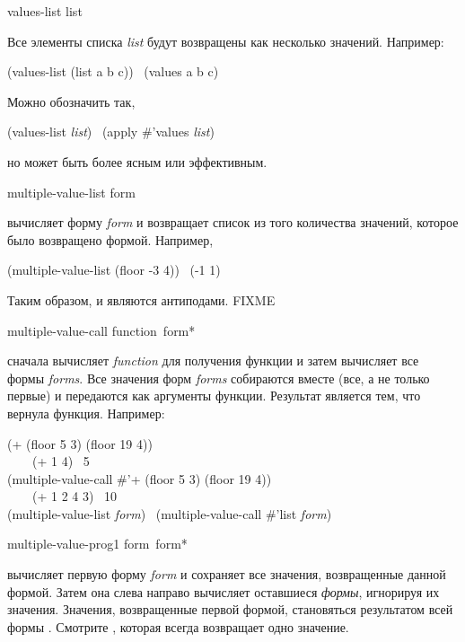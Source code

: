 \begin{defun}[Function]
values-list list

Все элементы списка \emph{list} будут возвращены как несколько значений.
Например:
\begin{lisp}
(values-list (list a b c)) \EQ\ (values a b c)
\end{lisp}
Можно обозначить так,
\begin{lisp}
(values-list \emph{list}) \EQ\ (apply \#'values \emph{list})
\end{lisp}
но  может быть более ясным или эффективным.
\end{defun}

\begin{defmac}
multiple-value-list form

 вычисляет форму \emph{form} и возвращает список из
того количества значений, которое было возвращено формой.
Например,
\begin{lisp}
(multiple-value-list (floor -3 4)) \EV\ (-1 1)
\end{lisp}
Таким образом,  и  являются
антиподами. FIXME
\end{defmac}

\begin{defspec}
multiple-value-call function {\,form}*

 сначала вычисляет \emph{function} для получения
функции и затем вычисляет все формы \emph{forms}. Все значения форм \emph{forms}
собираются вместе (все, а не только первые) и передаются как аргументы
функции. Результат  является тем, что вернула функция.
Например:
\begin{lisp}
(+ (floor 5 3) (floor 19 4)) \\
~~~\EQ\ (+ 1 4) \EV\ 5 \\
(multiple-value-call \#'+ (floor 5 3) (floor 19 4)) \\
~~~\EQ\ (+ 1 2 4 3) \EV\ 10 \\
(multiple-value-list \emph{form}) \EQ\ (multiple-value-call \#'list \emph{form})
\end{lisp}
\end{defspec}

\begin{defspec}
multiple-value-prog1 form {\,form}*

 вычисляет первую форму \emph{form} и сохраняет все
значения, возвращенные данной формой. Затем она слева направо вычисляет оставшиеся
\emph{формы}, игнорируя их значения. Значения, возвращенные первой формой,
становяться результатом всей формы . Смотрите
, которая всегда возвращает одно значение.
\end{defspec}

